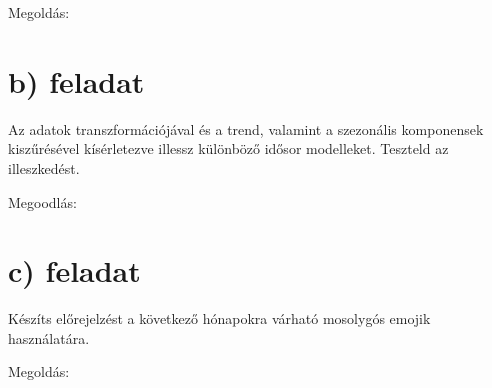 \documentclass[11pt,a4paper,oneside]{report}
\begin{document}
Megoldás:
\section{b) feladat}
Az adatok transzformációjával és a trend, valamint a szezonális komponensek kiszűrésével kísérletezve illessz különböző idősor modelleket. Teszteld az illeszkedést.

Megoodlás:

\section{c) feladat}
Készíts előrejelzést a következő hónapokra várható mosolygós emojik használatára.

Megoldás:
\end{document}
